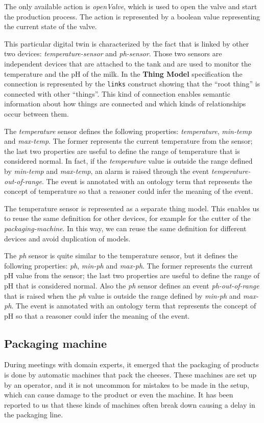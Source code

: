 The only available action is \textit{openValve}, which is used to open the valve and start the production process. The action is represented by a boolean value representing the current state of the valve.

This particular digital twin is characterized by the fact that is linked by other two devices: \textit{temperature-sensor} and \textit{ph-sensor}.
Those two sensors are independent devices that are attached to the tank and are used to monitor the temperature and the pH of the milk.
In the \textbf{Thing Model} specification the connection is represented by the \texttt{links} construct showing that the ``root thing'' is connected
with other ``things''.
This kind of connection enables semantic information about how things are connected and which kinds of relationships occur between them.

The \textit{temperature} sensor defines the following properties: \textit{temperature}, \textit{min-temp} and \textit{max-temp}. The former represents the current temperature from the sensor; the last two properties are useful to define the range of temperature that is considered normal.
In fact, if the \textit{temperature} value is outside the range defined by \textit{min-temp} and \textit{max-temp}, an alarm is raised through the event \textit{temperature-out-of-range}. The event is annotated with an ontology term that represents the concept of temperature so that a reasoner
could infer the meaning of the event.

The temperature sensor is represented as a separate thing model. This enables us to reuse the same definition for other devices, for example for the
cutter of the \textit{packaging-machine}. In this way, we can reuse the same definition for different devices and avoid duplication of models.

The \textit{ph} sensor is quite similar to the temperature sensor, but it defines the following properties: \textit{ph}, \textit{min-ph} and \textit{max-ph}. The former represents the current pH value from the sensor; the last two properties are useful to define the range of pH that is considered normal. Also the \textit{ph} sensor defines an event \textit{ph-out-of-range} that is raised when the \textit{ph} value is outside the range defined by \textit{min-ph} and \textit{max-ph}.
The event is annotated with an ontology term that represents the concept of pH so that a reasoner could infer the meaning of the event.

\subsection{Packaging machine}
During meetings with domain experts, it emerged that the packaging of products is done by automatic machines that pack the cheeses.
These machines are set up by an operator, and it is not uncommon for mistakes to be made in the setup, which can cause damage to the product or even
the machine. It has been reported to us that these kinds of machines often break down causing a delay in the packaging line.


